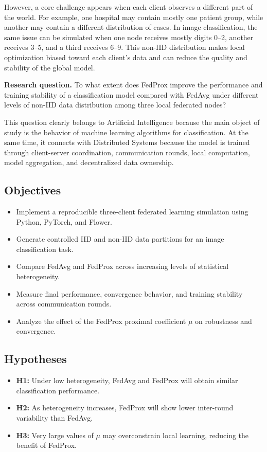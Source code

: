 \documentclass[11pt,a4paper]{article}
\begin{document}
However, a core challenge appears when each client observes a different part of the world. For example, one hospital may contain mostly one patient group, while another may contain a different distribution of cases. In image classification, the same issue can be simulated when one node receives mostly digits 0--2, another receives 3--5, and a third receives 6--9. This non-IID distribution makes local optimization biased toward each client's data and can reduce the quality and stability of the global model.

\textbf{Research question.} To what extent does FedProx improve the performance and training stability of a classification model compared with FedAvg under different levels of non-IID data distribution among three local federated nodes?

This question clearly belongs to Artificial Intelligence because the main object of study is the behavior of machine learning algorithms for classification. At the same time, it connects with Distributed Systems because the model is trained through client-server coordination, communication rounds, local computation, model aggregation, and decentralized data ownership.

\subsection{Objectives}

\begin{itemize}
    \item Implement a reproducible three-client federated learning simulation using Python, PyTorch, and Flower.
    \item Generate controlled IID and non-IID data partitions for an image classification task.
    \item Compare FedAvg and FedProx across increasing levels of statistical heterogeneity.
    \item Measure final performance, convergence behavior, and training stability across communication rounds.
    \item Analyze the effect of the FedProx proximal coefficient $\mu$ on robustness and convergence.
\end{itemize}

\subsection{Hypotheses}

\begin{itemize}
    \item \textbf{H1:} Under low heterogeneity, FedAvg and FedProx will obtain similar classification performance.
    \item \textbf{H2:} As heterogeneity increases, FedProx will show lower inter-round variability than FedAvg.
    \item \textbf{H3:} Very large values of $\mu$ may overconstrain local learning, reducing the benefit of FedProx.
\end{itemize}
\end{document}
